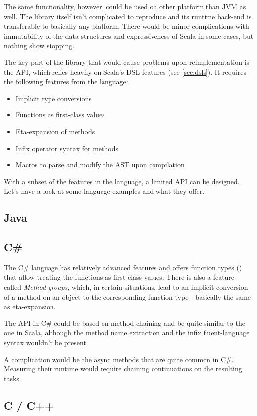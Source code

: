 The same functionality, however, could be used on other platform than JVM as well. The library itself isn't complicated to reproduce and its runtime back-end is transferable to basically any platform. There would be minor complications with immutability of the data structures and expressiveness of Scala in some cases, but nothing show stopping.

The key part of the library that would cause problems upon reimplementation is the API, which relies heavily on Scala's DSL features (see \ref{sec:dsls}). It requires the following features from the language:

\begin{itemize}
	\item Implicit type conversions
	\item Functions as first-class values
	\item Eta-expansion of methods
	\item Infix operator syntax for methods
	\item Macros to parse and modify the AST upon compilation
\end{itemize}

With a subset of the features in the language, a limited API can be designed. Let's have a look at some language examples and what they offer.

\subsection{Java}

\subsection{C\#}

The C\# language has relatively advanced features and offers function types () that allow treating the functions as first class values. There is also a feature called \textit{Method groups}, which, in certain situations, lead to an implicit conversion of a method on an object to the corresponding function type - basically the same as eta-expansion.


The API in C\# could be based on method chaining and be quite similar to the one in Scala, although the method name extraction and the infix fluent-language syntax wouldn't be present.

A complication would be the async methods that are quite common in C\#. Measuring their runtime would require chaining continuations on the resulting tasks.

\subsection{C / C++}